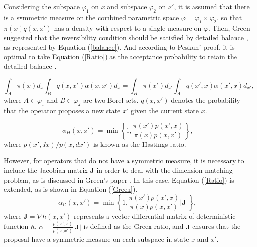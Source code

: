 \documentclass{bmcart}
\begin{document}
\begin{backmatter}
Considering the subspace $\varphi_1$ on $x$ and subspace $\varphi_2$ on $x'$, it is assumed that there is a symmetric measure on the combined parametric space $\varphi = {\varphi_1} \times {\varphi_2}$, so that ${\pi (x)}{q(x, x')}$ has a density with respect to a single measure on $\varphi$. Then, Green suggested that the reversibility condition should be satisfied by detailed balance \cite{green1995reversible}, as represented by Equation (\ref{balance}). And according to Peskun' proof, it is optimal to take Equation (\ref{Ratio}) as the acceptance probability to retain the detailed balance \cite{peskun1973optimum}.

\begin{equation}\label{balance}
\int_A {\pi (x) d_x} {\int_B  {q(x, x')}{\alpha(x, x')} d_x}  = \int_B {\pi (x') d_{x'}}{\int_A {q(x', x)}{\alpha(x', x)} d_{x'}} \text{,}
\end{equation}
where $A \in {\varphi_1}$ and $B \in  {\varphi_2}$ are two Borel sets. ${q(x, x')}$ denotes the probability that the operator proposes a new state $x'$ given the current state $x$.

\begin{equation}\label{Ratio}
{\alpha_H}(x, x') = \min \left\{ {1,\frac{{\pi (x'){p}(x',x)}}{{\pi (x){p}(x,x')}}} \right\} \text{,}
\end{equation}
where ${p(x',dx)}/{p(x,dx')}$ is known as the Hastings ratio.

However, for operators that do not have a symmetric measure, it is necessary to include the Jacobian matrix ${\mathbf{J}}$  in order to deal with the dimension matching problem, as is discussed in Green's paper \cite{green1995reversible}. In this case, Equation (\ref{Ratio}) is extended, as is shown in Equation (\ref{Green}).
\begin{equation}\label{Green}
{\alpha_G}(x, x') = \min \left\{ {1,\frac{{\pi (x'){p}(x',x)}}{{\pi (x){p}(x,x')}}}\left|{\mathbf{J}}\right| \right\} \text{,}
\end{equation}
where ${\mathbf{J}} = {\nabla h(x, x')}$ represents a vector differential matrix of deterministic function $h$. $\alpha = \frac{{p}(x',x)}{{p}(x,x')}\left|{\mathbf{J}}\right|$ is defined as the Green ratio, and ${\mathbf{J}}$ ensures that the proposal have a symmetric measure on each subspace in state $x$ and $x'$.


\end{backmatter}
\end{document}
